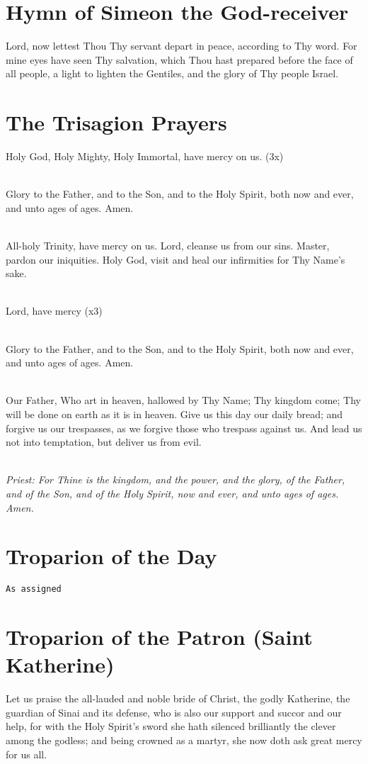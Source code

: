 \section*{Hymn of Simeon the God-receiver}
Lord, now lettest Thou Thy servant depart in peace, 
according to Thy word.
For mine eyes have seen Thy salvation,
which Thou hast prepared before the face of all people,
a light to lighten the Gentiles,
and the glory of Thy people Israel.

\section*{The Trisagion Prayers}
Holy God, Holy Mighty, Holy Immortal, have mercy on us. (3x)

\mbox{}\\
Glory to the Father, and to the Son, and to the Holy Spirit, both now and ever, and unto ages of ages. Amen.

\mbox{}\\
All-holy Trinity, have mercy on us.
Lord, cleanse us from our sins.
Master, pardon our iniquities.
Holy God, visit and heal our infirmities for Thy Name's sake.

\mbox{}\\
Lord, have mercy (x3)

\mbox{}\\
Glory to the Father, and to the Son, and to the Holy Spirit, both now and ever, and unto ages of ages. Amen.

\mbox{}\\
Our Father, Who art in heaven, hallowed by Thy Name;
Thy kingdom come; Thy will be done on earth as it is in heaven.
Give us this day our daily bread;
and forgive us our trespasses, as we forgive those who 
trespass against us.  And lead us not into temptation,
but deliver us from evil.

\mbox{}\\
\emph{Priest: For Thine is the kingdom, and the power, and the glory,
of the Father, and of the Son, and of the Holy Spirit, now and ever,
and unto ages of ages. Amen.}

\section*{Troparion of the Day}
\texttt{As assigned}

\section*{Troparion of the Patron (Saint Katherine)}
Let us praise the all-lauded and noble bride of Christ,
the godly Katherine,
the guardian of Sinai and its defense,
who is also our support and succor and our help,
for with the Holy Spirit's sword
she hath silenced brilliantly the clever among the godless;
and being crowned as a martyr, she now doth ask great mercy for us all.

